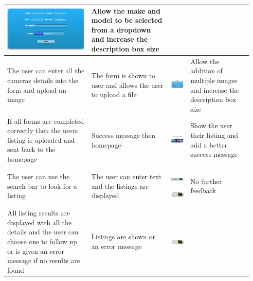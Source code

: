 \begin{center}
\begin{longtable}{|P{30mm}|P{20mm}|P{60mm}|P{25mm}|}
\includegraphics[width=57mm]{ch4_testing_for_eval/media/image20.png}
& Allow the make and model to be selected from a dropdown and increase
the description box size \\ \hline
The user can enter all the cameras details into the form and upload an
image & The form is shown to user and allows the user to upload a file &
\includegraphics[width=57mm]{ch4_testing_for_eval/media/image48.png}
& Allow the addition of multiple images and increase the description box
size \\ \hline
If all forms are completed correctly then the users listing is uploaded
and sent back to the homepage & Success message then homepage &
\includegraphics[width=57mm]{ch4_testing_for_eval/media/image6.png} &
Show the user their listing and add a better success message \\ \hline
The user can use the search bar to look for a listing & The user can
enter text and the listings are displayed &
\includegraphics[width=57mm]{ch4_testing_for_eval/media/image27.png}

\includegraphics[width=57mm]{ch4_testing_for_eval/media/image28.png}
& No further feedback \\ \hline
All listing results are displayed with all the details and the user can
choose one to follow up or is given an error message if no results are
found & Listings are shown or an error message &
\includegraphics[width=57mm]{ch4_testing_for_eval/media/image28.png}


\end{longtable}
\end{center}
